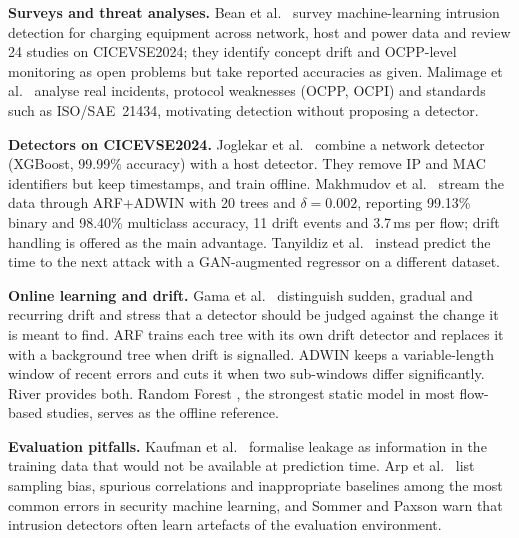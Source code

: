 \documentclass[preprint,12pt]{elsarticle}
\begin{document}
\textbf{Surveys and threat analyses.} Bean et al.\ \cite{b1} survey machine-learning intrusion detection for charging equipment across network, host and power data and review 24 studies on CICEVSE2024; they identify concept drift and OCPP-level monitoring as open problems but take reported accuracies as given. Malimage et al.\ \cite{b3} analyse real incidents, protocol weaknesses (OCPP, OCPI) and standards such as ISO/SAE~21434, motivating detection without proposing a detector.

\textbf{Detectors on CICEVSE2024.} Joglekar et al.\ \cite{b2} combine a network detector (XGBoost, 99.99\% accuracy) with a host detector. They remove IP and MAC identifiers but keep timestamps, and train offline. Makhmudov et al.\ \cite{b4} stream the data through ARF+ADWIN with 20 trees and $\delta = 0.002$, reporting 99.13\% binary and 98.40\% multiclass accuracy, 11 drift events and 3.7\,ms per flow; drift handling is offered as the main advantage. Tanyildiz et al.\ \cite{b5} instead predict the time to the next attack with a GAN-augmented regressor on a different dataset.

\textbf{Online learning and drift.} Gama et al.\ \cite{b15} distinguish sudden, gradual and recurring drift and stress that a detector should be judged against the change it is meant to find. ARF \cite{b6} trains each tree with its own drift detector and replaces it with a background tree when drift is signalled. ADWIN \cite{b7} keeps a variable-length window of recent errors and cuts it when two sub-windows differ significantly. River \cite{b9} provides both. Random Forest \cite{b16}, the strongest static model in most flow-based studies, serves as the offline reference.

\textbf{Evaluation pitfalls.} Kaufman et al.\ \cite{b10} formalise leakage as information in the training data that would not be available at prediction time. Arp et al.\ \cite{b11} list sampling bias, spurious correlations and inappropriate baselines among the most common errors in security machine learning, and Sommer and Paxson \cite{b13} warn that intrusion detectors often learn artefacts of the evaluation environment.
\end{document}
